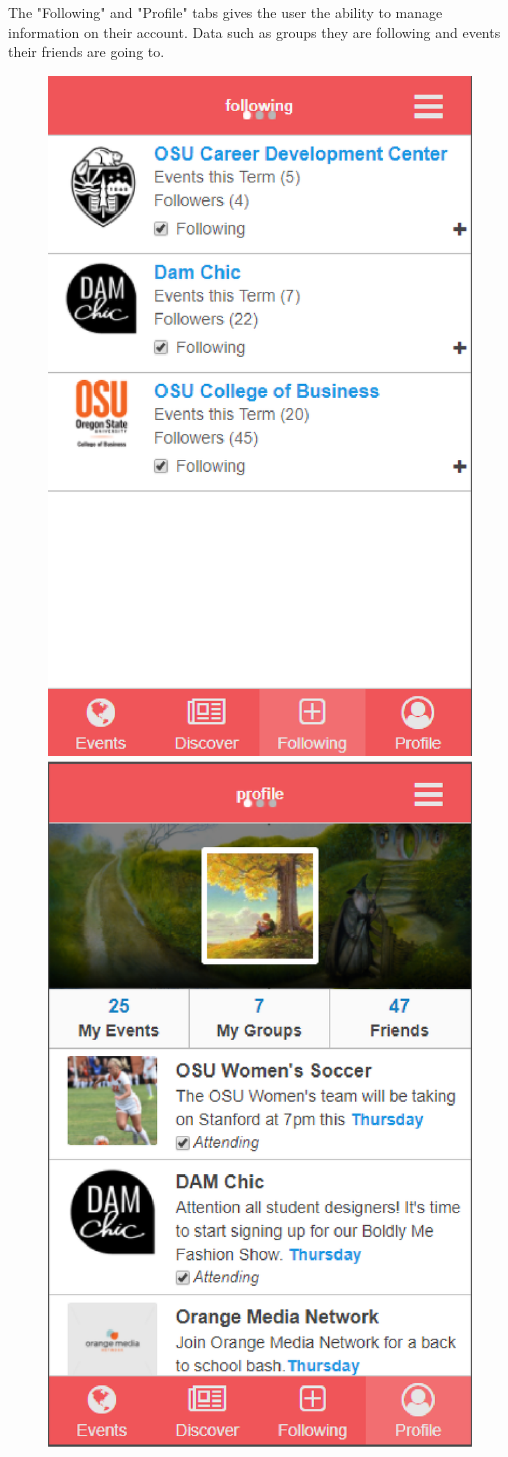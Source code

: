 \documentclass[letterpaper, 10pt,titlepage]{article}
\begin{document}
The "Following" and "Profile" tabs gives the user the ability to manage information on their account. Data such as groups they are following and events their friends are going to.
  \begin{figure}[H]
  \centering
  \begin{minipage}{.5\textwidth}
    \centering
    \includegraphics[width=.55\linewidth]{following.eps}
  \end{minipage}%
  \begin{minipage}{.5\textwidth}
    \centering
    \includegraphics[width=.55\linewidth]{profile.eps}
  \end{minipage}
  \end{figure}
\end{document}
